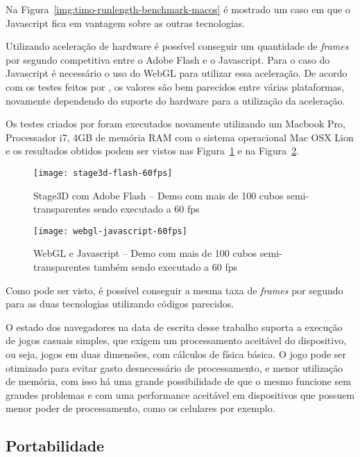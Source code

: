 Na Figura~\ref{img:timo-runlength-benchmark-macos} é mostrado um caso
em que o Javascript fica em vantagem sobre as outras tecnologias.

Utilizando aceleração de hardware é possível conseguir um quantidade
de \textit{frames} por segundo competitiva entre o Adobe Flash e o
Javascript. Para o caso do Javascript é necessário o uso do WebGL para
utilizar essa aceleração. De acordo com os testes feitos por
, os valores são bem parecidos entre várias
plataformas, novamente dependendo do suporte do hardware para a
utilização da aceleração.

Os testes criados por  foram executados
novamente utilizando um
Macbook Pro, Processador i7, 4GB de memória RAM com o sistema operacional
Mac OSX Lion e os resultados obtidos podem ser vistos nas Figura~\ref{img:stage3d-flash-60fps}
e na Figura~\ref{img:webgl-javascript-60fps}.

\begin{figure}[H]
  \centering
	\texttt{[image: stage3d-flash-60fps]}
  \caption{Stage3D com Adobe Flash {--} Demo com mais de 100 cubos
  semi-transparentes sendo executado a 60 fps}
  \label{img:stage3d-flash-60fps}
\end{figure}

\begin{figure}[H]
  \centering
	\texttt{[image: webgl-javascript-60fps]}
  \caption{WebGL e Javascript {--} Demo com mais de 100 cubos
  semi-transparentes também sendo executado a 60 fps}
  \label{img:webgl-javascript-60fps}
\end{figure}

Como pode ser visto, é possível conseguir a mesma taxa de
\textit{frames} por segundo para as duas tecnologias utilizando
códigos parecidos.

O estado dos navegadores na data de escrita desse
trabalho suporta a execução de jogos casuais simples, que exigem
um processamento aceitável do dispositivo, ou seja, jogos em duas
dimensões, com cálculos de física básica. O jogo pode ser otimizado
para evitar gasto desnecessário de processamento, e menor utilização
de memória, com isso há uma grande possibilidade de que o mesmo
funcione sem grandes problemas e com uma performance aceitável em dispositivos
que possuem menor poder de processamento, como os celulares por exemplo.

\subsection{Portabilidade}

